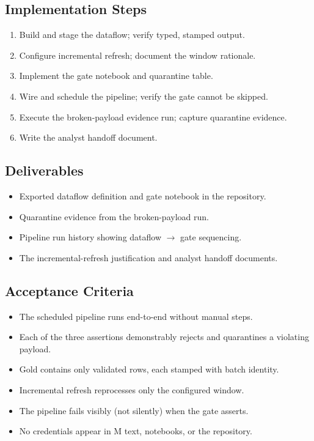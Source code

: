 \subsection*{Implementation Steps}
\begin{enumerate}
    \item Build and stage the dataflow; verify typed, stamped output.
    \item Configure incremental refresh; document the window rationale.
    \item Implement the gate notebook and quarantine table.
    \item Wire and schedule the pipeline; verify the gate cannot be skipped.
    \item Execute the broken-payload evidence run; capture quarantine evidence.
    \item Write the analyst handoff document.
\end{enumerate}

\subsection*{Deliverables}
\begin{itemize}
    \item Exported dataflow definition and gate notebook in the repository.
    \item Quarantine evidence from the broken-payload run.
    \item Pipeline run history showing dataflow $\rightarrow$ gate sequencing.
    \item The incremental-refresh justification and analyst handoff documents.
\end{itemize}

\subsection*{Acceptance Criteria}
\begin{itemize}
    \item[\(\square\)] The scheduled pipeline runs end-to-end without manual steps.
    \item[\(\square\)] Each of the three assertions demonstrably rejects and quarantines a violating payload.
    \item[\(\square\)] Gold contains only validated rows, each stamped with batch identity.
    \item[\(\square\)] Incremental refresh reprocesses only the configured window.
    \item[\(\square\)] The pipeline fails visibly (not silently) when the gate asserts.
    \item[\(\square\)] No credentials appear in M text, notebooks, or the repository.
\end{itemize}

